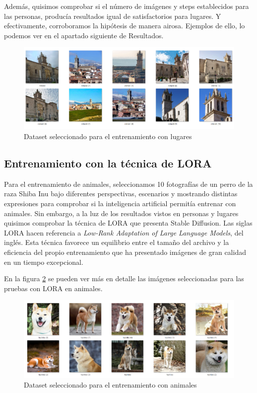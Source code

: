 Además, quisimos comprobar si el número de imágenes y steps establecidos para las personas, producía resultados igual de satisfactorios para lugares. Y efectivamente, corroboramos la hipótesis de manera airosa. Ejemplos de ello, lo podemos ver en el apartado siguiente de Resultados.  

\begin{figure}[!htb]
	\centering
	\includegraphics[width = 0.7
	\textwidth]{Imagenes/Vectorial/dataset_colmenar.png}
	\caption{Dataset seleccionado para el entrenamiento con lugares}
	\label{fig:datasetcolme}
\end{figure}


\subsection{Entrenamiento con la técnica de LORA}

Para el entrenamiento de animales, seleccionamos 10 fotografías de un perro de la raza Shiba Inu bajo diferentes perspectivas, escenarios y mostrando distintas expresiones para comprobar si la inteligencia artificial permitía entrenar con animales. Sin embargo, a la luz de los resultados vistos en personas y lugares quisimos comprobar la técnica de LORA que presenta Stable Diffusion. Las siglas LORA hacen referencia a \textit{Low-Rank Adaptation of Large Language Models}, del inglés. Esta técnica favorece un equilibrio entre el tamaño del archivo y la eficiencia del propio entrenamiento que ha presentado imágenes de gran calidad en un tiempo excepcional. 

En la figura \ref{fig:datasethachi} se pueden ver más en detalle las imágenes seleccionadas para las pruebas con LORA en animales.

\begin{figure}[h]
	\centering
	\includegraphics[width = 1
	\textwidth]{Imagenes/Vectorial/dataset_hachiko.png}
	\caption{Dataset seleccionado para el entrenamiento con animales}
	\label{fig:datasethachi}
\end{figure}

